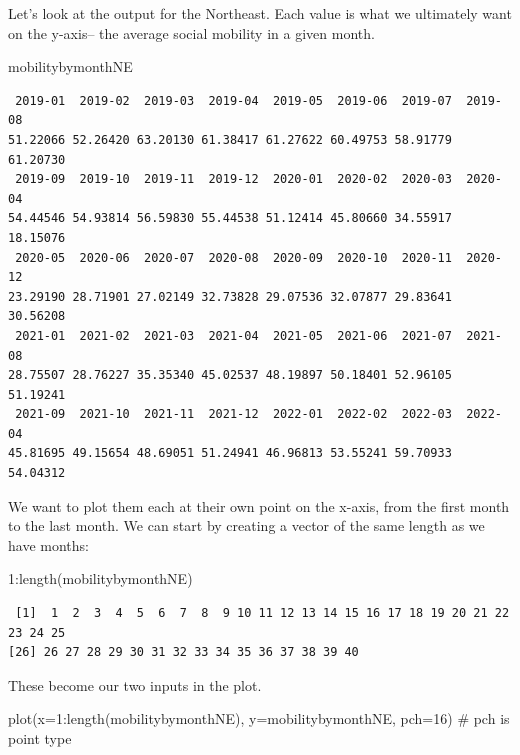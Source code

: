 \documentclass[
  letterpaper,
  DIV=11,
  numbers=noendperiod]{scrreprt}
\newenvironment{Shaded}{\begin{snugshade}}{\end{snugshade}}
\newcommand{\AttributeTok}[1]{\textcolor[rgb]{0.40,0.45,0.13}{#1}}
\newcommand{\CommentTok}[1]{\textcolor[rgb]{0.37,0.37,0.37}{#1}}
\newcommand{\DecValTok}[1]{\textcolor[rgb]{0.68,0.00,0.00}{#1}}
\newcommand{\FunctionTok}[1]{\textcolor[rgb]{0.28,0.35,0.67}{#1}}
\newcommand{\NormalTok}[1]{\textcolor[rgb]{0.00,0.23,0.31}{#1}}
\newcommand{\SpecialCharTok}[1]{\textcolor[rgb]{0.37,0.37,0.37}{#1}}
\begin{document}
Let's look at the output for the Northeast. Each value is what we
ultimately want on the y-axis-- the average social mobility in a given
month.

\begin{Shaded}
\begin{Highlighting}[]
\NormalTok{mobilitybymonthNE}
\end{Highlighting}
\end{Shaded}

\begin{verbatim}
 2019-01  2019-02  2019-03  2019-04  2019-05  2019-06  2019-07  2019-08 
51.22066 52.26420 63.20130 61.38417 61.27622 60.49753 58.91779 61.20730 
 2019-09  2019-10  2019-11  2019-12  2020-01  2020-02  2020-03  2020-04 
54.44546 54.93814 56.59830 55.44538 51.12414 45.80660 34.55917 18.15076 
 2020-05  2020-06  2020-07  2020-08  2020-09  2020-10  2020-11  2020-12 
23.29190 28.71901 27.02149 32.73828 29.07536 32.07877 29.83641 30.56208 
 2021-01  2021-02  2021-03  2021-04  2021-05  2021-06  2021-07  2021-08 
28.75507 28.76227 35.35340 45.02537 48.19897 50.18401 52.96105 51.19241 
 2021-09  2021-10  2021-11  2021-12  2022-01  2022-02  2022-03  2022-04 
45.81695 49.15654 48.69051 51.24941 46.96813 53.55241 59.70933 54.04312 
\end{verbatim}

We want to plot them each at their own point on the x-axis, from the
first month to the last month. We can start by creating a vector of the
same length as we have months:

\begin{Shaded}
\begin{Highlighting}[]
\DecValTok{1}\SpecialCharTok{:}\FunctionTok{length}\NormalTok{(mobilitybymonthNE)}
\end{Highlighting}
\end{Shaded}

\begin{verbatim}
 [1]  1  2  3  4  5  6  7  8  9 10 11 12 13 14 15 16 17 18 19 20 21 22 23 24 25
[26] 26 27 28 29 30 31 32 33 34 35 36 37 38 39 40
\end{verbatim}

These become our two inputs in the plot.

\begin{Shaded}
\begin{Highlighting}[]
\FunctionTok{plot}\NormalTok{(}\AttributeTok{x=}\DecValTok{1}\SpecialCharTok{:}\FunctionTok{length}\NormalTok{(mobilitybymonthNE),}
     \AttributeTok{y=}\NormalTok{mobilitybymonthNE, }\AttributeTok{pch=}\DecValTok{16}\NormalTok{) }\CommentTok{\# pch is point type}
\end{Highlighting}
\end{Shaded}
\end{document}
